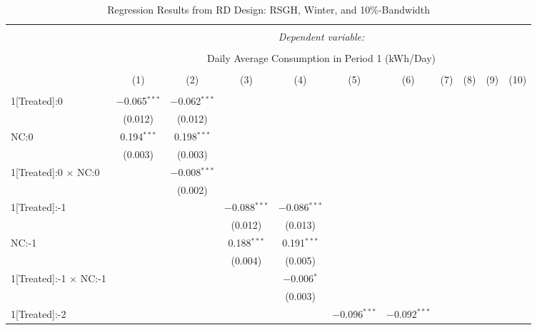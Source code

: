 \begin{table}[!htbp]
\centering 
\caption{Regression Results from RD Design: RSGH, Winter, and 10\%-Bandwidth} 
\label{} 
\footnotesize
\begin{adjustbox}{scale = 0.75}
\begin{tabular}{@{\extracolsep{5pt}}lcccccccccc} 
\\[-1.8ex]\hline 
\hline \\[-1.8ex] 
 & \multicolumn{10}{c}{\textit{Dependent variable:}} \\ 
\cline{2-11} 
\\[-1.8ex] & \multicolumn{10}{c}{Daily Average Consumption in Period 1 (kWh/Day)} \\ 
\\[-1.8ex] & (1) & (2) & (3) & (4) & (5) & (6) & (7) & (8) & (9) & (10)\\ 
\hline \\[-1.8ex] 
 1[Treated]:0 & $-$0.065$^{***}$ & $-$0.062$^{***}$ &  &  &  &  &  &  &  &  \\ 
  & (0.012) & (0.012) &  &  &  &  &  &  &  &  \\ 
 NC:0 & 0.194$^{***}$ & 0.198$^{***}$ &  &  &  &  &  &  &  &  \\ 
  & (0.003) & (0.003) &  &  &  &  &  &  &  &  \\ 
 1[Treated]:0 $\times$ NC:0 &  & $-$0.008$^{***}$ &  &  &  &  &  &  &  &  \\ 
  &  & (0.002) &  &  &  &  &  &  &  &  \\ 
 1[Treated]:-1 &  &  & $-$0.088$^{***}$ & $-$0.086$^{***}$ &  &  &  &  &  &  \\ 
  &  &  & (0.012) & (0.013) &  &  &  &  &  &  \\ 
 NC:-1 &  &  & 0.188$^{***}$ & 0.191$^{***}$ &  &  &  &  &  &  \\ 
  &  &  & (0.004) & (0.005) &  &  &  &  &  &  \\ 
 1[Treated]:-1 $\times$ NC:-1 &  &  &  & $-$0.006$^{*}$ &  &  &  &  &  &  \\ 
  &  &  &  & (0.003) &  &  &  &  &  &  \\ 
 1[Treated]:-2 &  &  &  &  & $-$0.096$^{***}$ & $-$0.092$^{***}$ &  &  &  &  \\ 

\end{tabular}
\end{adjustbox}
\end{table}
